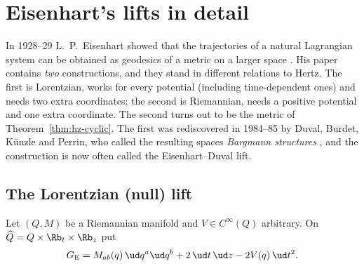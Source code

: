 %

\section{Eisenhart's lifts in detail}
\label{sec:hz-eisenhart}

In 1928--29 L.~P.~Eisenhart showed that the trajectories of a natural
Lagrangian system can be obtained as geodesics of a metric on a larger space
\cite{hdp:eisenhart1929}. His paper contains \emph{two} constructions,
and they stand in different relations to Hertz. The first is
Lorentzian, works for every potential (including time-dependent ones) and
needs two extra coordinates; the second is Riemannian, needs a positive
potential and one extra coordinate. The second turns out to be
the metric of Theorem~\ref{thm:hz-cyclic}. The first was rediscovered
in 1984--85 by Duval, Burdet, K\"unzle and Perrin, who called the resulting
spaces \emph{Bargmann structures} \cite{hdp:duval1985,hdp:duval1991}, and
the construction is now often called the Eisenhart--Duval lift.

\subsection{The Lorentzian (null) lift}

\begin{definition}\label{def:hz-eis}
Let $(Q,M)$ be a Riemannian manifold and $V\in C^\infty(Q)$ arbitrary. On
$\widehat Q=Q\times\Rb_t\times\Rb_z$ put
\begin{equation}\label{eq:hz-eis-metric}
  G_{\rm E}=M_{ab}(q)\,\ud q^a\ud q^b+2\,\ud t\,\ud z-2V(q)\,\ud t^2 .
\end{equation}
\end{definition}

